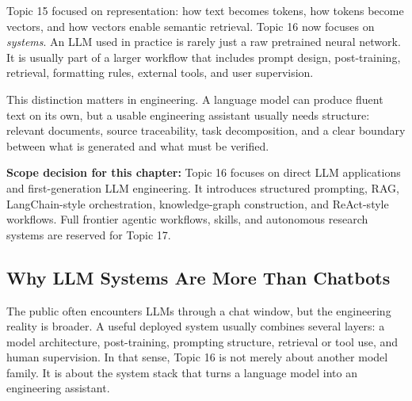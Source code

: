 \documentclass[12pt]{article}
\begin{document}
Topic 15 focused on representation: how text becomes tokens, how tokens become vectors, and how vectors enable semantic retrieval. Topic 16 now focuses on \emph{systems}. An LLM used in practice is rarely just a raw pretrained neural network. It is usually part of a larger workflow that includes prompt design, post-training, retrieval, formatting rules, external tools, and user supervision.

This distinction matters in engineering. A language model can produce fluent text on its own, but a usable engineering assistant usually needs structure: relevant documents, source traceability, task decomposition, and a clear boundary between what is generated and what must be verified.

\begin{alert-box}
\textbf{Scope decision for this chapter:} Topic 16 focuses on direct LLM applications and first-generation LLM engineering. It introduces structured prompting, RAG, LangChain-style orchestration, knowledge-graph construction, and ReAct-style workflows. Full frontier agentic workflows, skills, and autonomous research systems are reserved for Topic 17.
\end{alert-box}

\subsection{Why LLM Systems Are More Than Chatbots}

The public often encounters LLMs through a chat window, but the engineering reality is broader. A useful deployed system usually combines several layers: a model architecture, post-training, prompting structure, retrieval or tool use, and human supervision. In that sense, Topic 16 is not merely about another model family. It is about the system stack that turns a language model into an engineering assistant.
\end{document}
